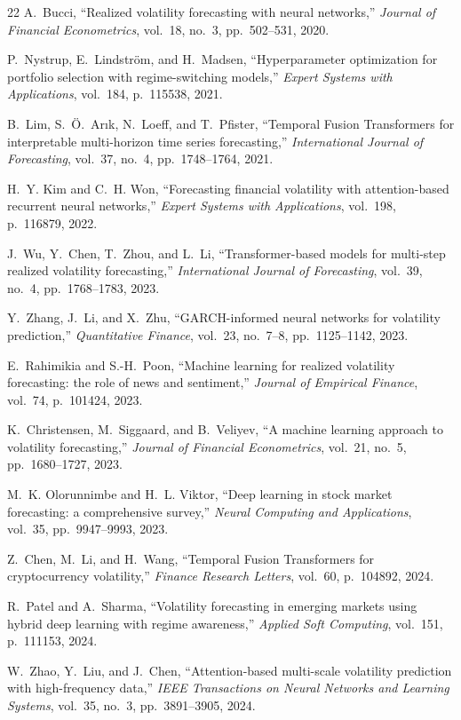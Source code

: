 {\begin{thebibliography}{22}
 A.~Bucci, ``Realized volatility forecasting with neural networks,'' \emph{Journal of Financial Econometrics}, vol.~18, no.~3, pp.~502--531, 2020.

 P.~Nystrup, E.~Lindstr\"{o}m, and H.~Madsen, ``Hyperparameter optimization for portfolio selection with regime-switching models,'' \emph{Expert Systems with Applications}, vol.~184, p.~115538, 2021.

 B.~Lim, S.~\"{O}.~Ar\i k, N.~Loeff, and T.~Pfister, ``Temporal Fusion Transformers for interpretable multi-horizon time series forecasting,'' \emph{International Journal of Forecasting}, vol.~37, no.~4, pp.~1748--1764, 2021.

 H.~Y. Kim and C.~H. Won, ``Forecasting financial volatility with attention-based recurrent neural networks,'' \emph{Expert Systems with Applications}, vol.~198, p.~116879, 2022.

 J.~Wu, Y.~Chen, T.~Zhou, and L.~Li, ``Transformer-based models for multi-step realized volatility forecasting,'' \emph{International Journal of Forecasting}, vol.~39, no.~4, pp.~1768--1783, 2023.

 Y.~Zhang, J.~Li, and X.~Zhu, ``GARCH-informed neural networks for volatility prediction,'' \emph{Quantitative Finance}, vol.~23, no.~7--8, pp.~1125--1142, 2023.

 E.~Rahimikia and S.-H.~Poon, ``Machine learning for realized volatility forecasting: the role of news and sentiment,'' \emph{Journal of Empirical Finance}, vol.~74, p.~101424, 2023.

 K.~Christensen, M.~Siggaard, and B.~Veliyev, ``A machine learning approach to volatility forecasting,'' \emph{Journal of Financial Econometrics}, vol.~21, no.~5, pp.~1680--1727, 2023.

 M.~K. Olorunnimbe and H.~L. Viktor, ``Deep learning in stock market forecasting: a comprehensive survey,'' \emph{Neural Computing and Applications}, vol.~35, pp.~9947--9993, 2023.

 Z.~Chen, M.~Li, and H.~Wang, ``Temporal Fusion Transformers for cryptocurrency volatility,'' \emph{Finance Research Letters}, vol.~60, p.~104892, 2024.

 R.~Patel and A.~Sharma, ``Volatility forecasting in emerging markets using hybrid deep learning with regime awareness,'' \emph{Applied Soft Computing}, vol.~151, p.~111153, 2024.

 W.~Zhao, Y.~Liu, and J.~Chen, ``Attention-based multi-scale volatility prediction with high-frequency data,'' \emph{IEEE Transactions on Neural Networks and Learning Systems}, vol.~35, no.~3, pp.~3891--3905, 2024.

\end{thebibliography}
}
